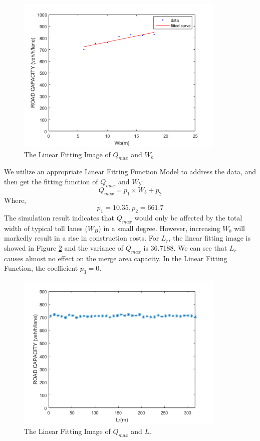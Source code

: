 \documentclass{mcmthesis}
\begin{document}
\begin{figure}[h]
\small
\centering
\includegraphics[width=10cm]{figure5}
\caption{The Linear Fitting Image of $Q_{max}$ and $W_b$}\label{fig5}
\end{figure}
We utilize an appropriate Linear Fitting Function Model
to address the data, and then get the fitting function
of $Q_{max}$ and $W_b$:
$$Q_{max}=p_{1}\times W_b+p_2$$
Where, $$p_1 =10.35, p_2 = 661.7$$
The simulation result indicates that $Q_{max}$ would only
be affected by the total width of typical toll lanes
($W_B$) in a small degree. However, increasing $W_b$ will
markedly result in a rise in construction costs.
For $L_r$, the linear fitting image is showed in Figure \ref{fig6}
and the variance of $Q_{max}$ is 36.7188. We can see that
$L_r$ causes almost no effect on the merge area capacity.
In the Linear Fitting Function, the coefficient $p_3=0$.
\begin{figure}[h]
\small
\centering
\includegraphics[width=10cm]{figure6}
\caption{The Linear Fitting Image of $Q_{max}$ and $L_r$}\label{fig6}
\end{figure}
\end{document}

